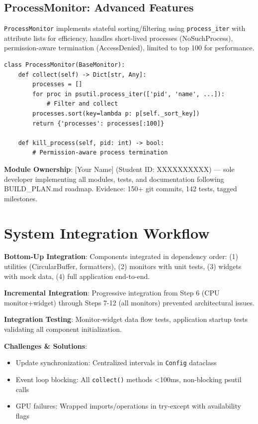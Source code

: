 \documentclass[12pt,a4paper,oneside]{report}
\begin{document}
\subsection{ProcessMonitor: Advanced Features}

\texttt{ProcessMonitor} implements stateful sorting/filtering using \texttt{process\_iter} with attribute lists for efficiency, handles short-lived processes (NoSuchProcess), permission-aware termination (AccessDenied), limited to top 100 for performance.

\begin{lstlisting}
class ProcessMonitor(BaseMonitor):
    def collect(self) -> Dict[str, Any]:
        processes = []
        for proc in psutil.process_iter(['pid', 'name', ...]):
            # Filter and collect
        processes.sort(key=lambda p: p[self._sort_key])
        return {'processes': processes[:100]}
    
    def kill_process(self, pid: int) -> bool:
        # Permission-aware process termination
\end{lstlisting}

\textbf{Module Ownership}: [Your Name] (Student ID: XXXXXXXXXX) --- sole developer implementing all modules, tests, and documentation following BUILD\_PLAN.md roadmap. Evidence: 150+ git commits, 142 tests, tagged milestones.

\section{System Integration Workflow}
\label{sec:integration-workflow}

\textbf{Bottom-Up Integration}: Components integrated in dependency order: (1) utilities (CircularBuffer, formatters), (2) monitors with unit tests, (3) widgets with mock data, (4) full application end-to-end.

\textbf{Incremental Integration}: Progressive integration from Step 6 (CPU monitor+widget) through Steps 7-12 (all monitors) prevented architectural issues.

\textbf{Integration Testing}: Monitor-widget data flow tests, application startup tests validating all component initialization.

\textbf{Challenges \& Solutions}:
\begin{itemize}
    \item Update synchronization: Centralized intervals in \texttt{Config} dataclass
    \item Event loop blocking: All \texttt{collect()} methods <100ms, non-blocking psutil calls
    \item GPU failures: Wrapped imports/operations in try-except with availability flags
\end{itemize}
\end{document}
